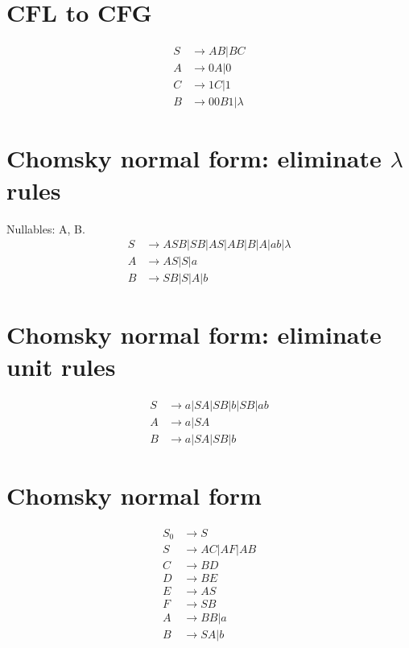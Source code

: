 \documentclass{article}
\begin{document}
\section{CFL to CFG}
\begin{align*}
S &\to AB | BC\\
A &\to 0A | 0\\
C &\to 1C | 1\\
B &\to 00B1 | \lambda
\end{align*}
\section{Chomsky normal form: eliminate $\lambda$ rules}
Nullables: A, B.
\begin{align*}
S &\to ASB | SB | AS | AB | B | A | ab | \lambda \\
A &\to AS | S | a \\
B &\to SB | S | A | b
\end{align*}
\section{Chomsky normal form: eliminate unit rules}
\begin{align*}
S &\to a | SA | SB | b | SB | ab \\
A &\to a | SA \\
B &\to a | SA | SB | b
\end{align*}
\section{Chomsky normal form}
\begin{align*}
S_0 &\to S\\
S &\to AC | AF | AB \\
C &\to BD \\
D &\to BE \\
E &\to AS \\
F &\to SB \\
A &\to BB | a\\
B &\to SA | b
\end{align*}
\end{document}
